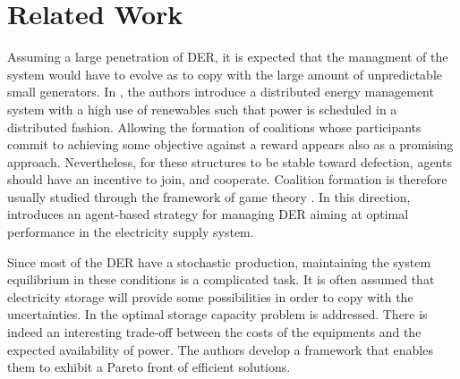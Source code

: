 \documentclass[journal]{IEEEtran}
\begin{document}
%
%

\section{Related Work}
\label{sec:related}


Assuming a large penetration of DER, it is expected that the managment of the system would have to evolve as to copy with the large amount of unpredictable small generators. In \cite{Zhang2013}, the authors introduce a distributed energy management system with a high use of renewables such that power is scheduled in a distributed fashion. Allowing the formation of coalitions whose participants commit to achieving some objective against a reward appears also as a promising approach. Nevertheless, for these structures to be stable toward defection, agents should have an incentive to join, and cooperate. Coalition formation is therefore usually studied through the framework of game theory \cite{Saad2011}. In this direction, \cite{Nguyen2013} introduces an agent-based strategy for managing DER aiming at optimal performance in the electricity supply system.

Since most of the DER have a stochastic production, maintaining the system equilibrium in these conditions is a complicated task. It is often assumed that electricity storage will provide some possibilities in order to copy with the uncertainties. In \cite{Shadmand2014} the optimal storage capacity problem is addressed. There is indeed an interesting trade-off between the costs of the equipments and the expected availability of power. The authors develop a framework that enables them to exhibit a Pareto front of efficient solutions.
\end{document}
